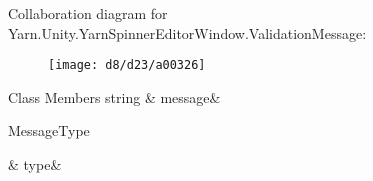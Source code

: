 Collaboration diagram for Yarn.\-Unity.\-Yarn\-Spinner\-Editor\-Window.\-Validation\-Message\-:
\nopagebreak
\begin{figure}[H]
\begin{center}
\leavevmode
\texttt{[image: d8/d23/a00326]}
\end{center}
\end{figure}
\begin{DoxyFields}{Class Members}
\hypertarget{a00162_a636dce6708e779c201fa5e7d01cf2955}{string}\label{a00162_a636dce6708e779c201fa5e7d01cf2955}
&
message&
\\
\hline

\hypertarget{a00162_a7d342190c7657fbbe85eb6fa66bcabb8}{Message\-Type}\label{a00162_a7d342190c7657fbbe85eb6fa66bcabb8}
&
type&
\\
\hline

\end{DoxyFields}
